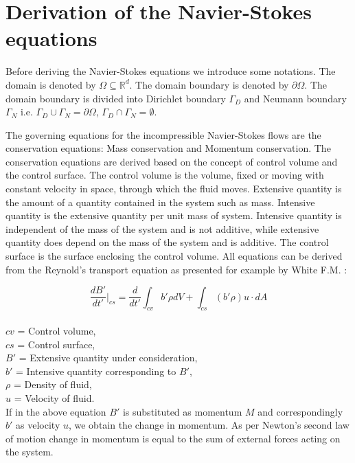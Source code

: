 \documentclass[a4paper,twoside,openright]{book}
\begin{document}
\section[Derivation]{Derivation of the Navier-Stokes equations}

Before deriving the Navier-Stokes equations we introduce some notations. The domain is denoted by $\Omega \subseteq \mathbb{R}^d $. The domain boundary is denoted by $\partial \Omega$. The domain boundary is divided into Dirichlet boundary $\Gamma_D$ and Neumann boundary $\Gamma_N$ i.e. $\Gamma_D \cup \Gamma_N = \partial \Omega $, $\Gamma_D \cap \Gamma_N = \emptyset $. 

The governing equations for the incompressible Navier-Stokes flows are the conservation equations: Mass conservation and Momentum conservation. The conservation equations are derived based on the concept of control volume and the control surface. The control volume is the volume, fixed or moving with constant velocity in space, through which the fluid moves. Extensive quantity is the amount of a quantity contained in the system such as mass. Intensive quantity is the extensive quantity per unit mass of system. Intensive quantity is independent of the mass of the system and is not additive, while extensive quantity does depend on the mass of the system and is additive. The control surface is the surface enclosing the control volume. All equations can be derived from the Reynold's transport equation as presented for example by White F.M. \cite{white}:


\begin{equation} \label{rtt} 
\frac{dB'}{dt'}|_{cs} = \frac{d}{dt'} \int_{cv} b' \rho dV + \int_{cs} (b' \rho) u\cdot dA 
\end{equation}
{}\\
$cv$ = Control volume,\\
$cs$ = Control surface,\\
$B'$ = Extensive quantity under consideration,\\
$b'$ = Intensive quantity corresponding to $B'$,\\
$\rho$ = Density of fluid,\\
$u$ = Velocity of fluid.\\

If in the above equation $B'$ is substituted as momentum $M$ and correspondingly $b'$ as velocity $u$, we obtain the change in momentum. As per Newton's second law of motion change in momentum is equal to the sum of external forces acting on the system. 
\end{document}
